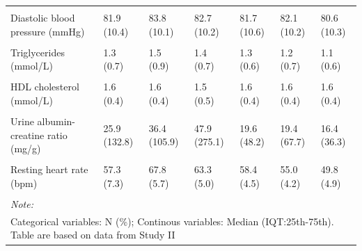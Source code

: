 \documentclass[
  a4paper,
  headsepline=true,
  open=left]{scrbook}
\begin{document}
\begin{landscape}
\begin{table}
{\begin{tabular}[t]{lllllll}
\addlinespace
\cellcolor{gray!6}{Systolic blood pressure (mmHg)} & \cellcolor{gray!6}{133.7 (17.3)} & \cellcolor{gray!6}{134.2 (16.3)} & \cellcolor{gray!6}{133.7 (17.6)} & \cellcolor{gray!6}{133.5 (17.8)} & \cellcolor{gray!6}{133.4 (16.9)} & \cellcolor{gray!6}{133.8 (17.5)}\\
Diastolic blood pressure (mmHg) & 81.9 (10.4) & 83.8 (10.1) & 82.7 (10.2) & 81.7 (10.6) & 82.1 (10.2) & 80.6 (10.3)\\
\cellcolor{gray!6}{HbA1c (\%)} & \cellcolor{gray!6}{5.8 (0.5)} & \cellcolor{gray!6}{5.9 (0.9)} & \cellcolor{gray!6}{5.9 (0.6)} & \cellcolor{gray!6}{5.8 (0.5)} & \cellcolor{gray!6}{5.7 (0.4)} & \cellcolor{gray!6}{5.7 (0.4)}\\
Triglycerides (mmol/L) & 1.3 (0.7) & 1.5 (0.9) & 1.4 (0.7) & 1.3 (0.6) & 1.2 (0.7) & 1.1 (0.6)\\
\cellcolor{gray!6}{Total cholesterol (mmol/L)} & \cellcolor{gray!6}{5.4 (1.1)} & \cellcolor{gray!6}{5.2 (1.0)} & \cellcolor{gray!6}{5.4 (1.2)} & \cellcolor{gray!6}{5.4 (1.1)} & \cellcolor{gray!6}{5.4 (1.0)} & \cellcolor{gray!6}{5.4 (1.0)}\\
\addlinespace
HDL cholesterol (mmol/L) & 1.6 (0.4) & 1.6 (0.4) & 1.5 (0.5) & 1.6 (0.4) & 1.6 (0.4) & 1.6 (0.4)\\
\cellcolor{gray!6}{LDL cholesterol (mmol/L)} & \cellcolor{gray!6}{3.2 (1.0)} & \cellcolor{gray!6}{3.0 (1.0)} & \cellcolor{gray!6}{3.2 (1.1)} & \cellcolor{gray!6}{3.2 (1.0)} & \cellcolor{gray!6}{3.3 (0.9)} & \cellcolor{gray!6}{3.3 (0.9)}\\
Urine albumin-creatine ratio (mg/g) & 25.9 (132.8) & 36.4 (105.9) & 47.9 (275.1) & 19.6 (48.2) & 19.4 (67.7) & 16.4 (36.3)\\
\cellcolor{gray!6}{VO2 max (mL/kg/min)} & \cellcolor{gray!6}{26.6 (7.8)} & \cellcolor{gray!6}{24.8 (7.5)} & \cellcolor{gray!6}{24.8 (7.5)} & \cellcolor{gray!6}{26.1 (6.8)} & \cellcolor{gray!6}{27.0 (8.0)} & \cellcolor{gray!6}{28.7 (8.7)}\\
Resting heart rate (bpm) & 57.3 (7.3) & 67.8 (5.7) & 63.3 (5.0) & 58.4 (4.5) & 55.0 (4.2) & 49.8 (4.9)\\
\addlinespace
\cellcolor{gray!6}{Anti-hypertensive medication (yes)} & \cellcolor{gray!6}{753 (47\%)} & \cellcolor{gray!6}{88 (61\%)} & \cellcolor{gray!6}{149 (48\%)} & \cellcolor{gray!6}{216 (47\%)} & \cellcolor{gray!6}{147 (43\%)} & \cellcolor{gray!6}{153 (43\%)}\\
\bottomrule
\multicolumn{7}{l}{\rule{0pt}{1em}\textit{Note: }}\\
\multicolumn{7}{l}{\rule{0pt}{1em}Categorical variables: N (\%); Continous variables: Median (IQT:25th-75th). Table are based on data from Study II}\\
\end{tabular}}
\endgroup{}
\end{table}
\end{landscape}
\end{document}
